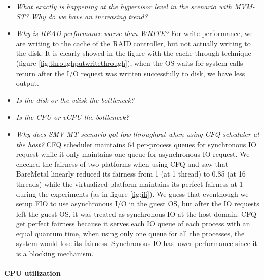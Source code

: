 \documentclass{acmsig}
\begin{document}
\begin{itemize}
 \item \textit{What exactly is happening at the hypervisor level in the scenario with MVM-ST? Why do we have an increasing trend?}
 \item \textit{Why is READ performance worse than WRITE?} For write performance, we are writing to the cache of the RAID controller, but not actually writing to the disk. It is clearly showed in the figure with the cache-through technique (figure \ref{fig:throughputwritethrough}), when the OS waits for system calls return after the I/O request was written successfully to disk, we have less output.
 \item \textit{Is the disk or the vdisk the bottleneck?} %
 \item \textit{Is the CPU or vCPU the bottleneck?} %
 \item \textit{Why does SMV-MT scenario got low throughput when using CFQ scheduler at the host?} CFQ scheduler maintains 64 per-process queues for synchronous IO request while it only maintains one queue for asynchronous IO request. We checked the fairness of two platforms when using CFQ and saw that BareMetal linearly reduced its fairness from 1 (at 1 thread) to 0.85 (at 16 threads) while the virtualized platform maintains its perfect fairness at 1 during the experiments (as in figure \ref{fig:jfi}). We guess that eventhough we setup FIO to use asynchronous I/O in the guest OS, but after the IO requests left the guest OS, it was treated as synchronous IO at the host domain. CFQ get perfect fairness because it serves each IO queue of each process with an equal quantum time, when using only one queue for all the processes, the system would lose its fairness. Synchronous IO has lower performance since it is a blocking mechanism.
\end{itemize}


\paragraph{CPU utilization}
\end{document}
